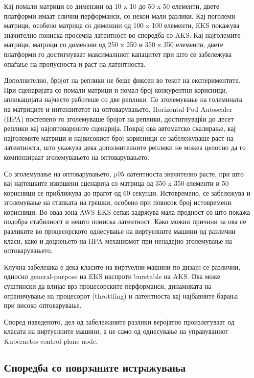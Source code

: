 \documentclass{article}
\begin{document}
Кај помали матрици со димензии од 10 x 10 до 50 x 50 елементи, двете платформи имаат слични перформанси, со некои мали разлики. Кај поголеми матрици, особено матрица со димензии од 100 x 100 елементи, EKS покажува значително пониска просечна латентност во споредба со AKS. Кај најголемите матрици, матрици со димензии од 250 x 250 и 350 x 350 елементи, двете платформи го достигнуваат максималниот капацитет при што се забележува опаѓање на пропусноста и раст на латентноста.

Дополнително, бројот на реплики не беше фиксен во текот на експериментите. При сценаријата со помали матрици и помал број конкурентни корисници, апликацијата најчесто работеше со две реплики. Со зголемување на големината на матриците и интензитетот на оптоварувањето, Horizontal Pod Autoscaler (HPA) постепено го зголемуваше бројот на реплики, достигнувајќи до десет реплики кај најоптоварените сценарија. Покрај ова автоматско скалирање, кај најголемите матрици и највисокиот број корисници се забележуваше раст на латентноста, што укажува дека дополнителните реплики не можеа целосно да го компензираат зголемувањето на оптоварувањето.

Со зголемување на оптоварувањето, p95 латентноста значително расте, при што кај најтешките извршени сценарија со матрица од 350 x 350 елементи и 50 корисници се приближува до прагот од 60 секунди. Истовремено, се забележува и зголемување на стапката на грешки, особено при повисок број истовремени корисници. Во оваа зона AWS EKS сепак задржува мала предност со што покажа подобра стабилност и нешто пониска латентност. Како можни причини за ова се разликите во процесорското однесување на виртуелните машини од различни класи, како и доцнењето на HPA механизмот при ненадејно зголемување на оптоварувањето.

Клучна забелешка е дека класите на виртуелни машини по дизајн се различни, односно general-purpose на EKS наспроти burstable на AKS. Ова може суштински да влијае врз процесорските перформанси, динамиката на ограничување на процесорот (throttling) и латентноста кај најбавните барања при високо оптоварување.

Според наведеното, дел од забележаните разлики веројатно произлегуваат од класата на виртуелните машини, а не само од однесување на управуваниот Kubernetes control plane node.

\subsection{Споредба со поврзаните истражувања}
\end{document}
